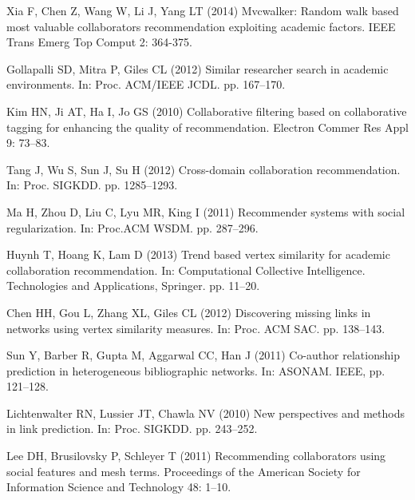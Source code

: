 \documentclass[10pt]{article}
\begin{document}
\begin{thebibliography}{10}
Xia F, Chen Z, Wang W, Li J, Yang LT (2014) Mvcwalker: Random walk based most
  valuable collaborators recommendation exploiting academic factors.
\newblock IEEE Trans Emerg Top Comput 2: 364-375.

Gollapalli SD, Mitra P, Giles CL (2012) Similar researcher search in academic
  environments.
\newblock In: Proc. ACM/IEEE JCDL. pp. 167--170.

Kim HN, Ji AT, Ha I, Jo GS (2010) Collaborative filtering based on
  collaborative tagging for enhancing the quality of recommendation.
\newblock Electron Commer Res Appl 9: 73--83.

Tang J, Wu S, Sun J, Su H (2012) Cross-domain collaboration recommendation.
\newblock In: Proc. SIGKDD. pp. 1285--1293.

Ma H, Zhou D, Liu C, Lyu MR, King I (2011) Recommender systems with social
  regularization.
\newblock In: Proc.ACM WSDM. pp. 287--296.

Huynh T, Hoang K, Lam D (2013) Trend based vertex similarity for academic
  collaboration recommendation.
\newblock In: Computational Collective Intelligence. Technologies and
  Applications, Springer. pp. 11--20.

Chen HH, Gou L, Zhang XL, Giles CL (2012) Discovering missing links in networks
  using vertex similarity measures.
\newblock In: Proc. ACM SAC. pp. 138--143.

Sun Y, Barber R, Gupta M, Aggarwal CC, Han J (2011) Co-author relationship
  prediction in heterogeneous bibliographic networks.
\newblock In: ASONAM. IEEE, pp. 121--128.

Lichtenwalter RN, Lussier JT, Chawla NV (2010) New perspectives and methods in
  link prediction.
\newblock In: Proc. SIGKDD. pp. 243--252.

Lee DH, Brusilovsky P, Schleyer T (2011) Recommending collaborators using
  social features and mesh terms.
\newblock Proceedings of the American Society for Information Science and
  Technology 48: 1--10.


\end{thebibliography}
\end{document}

